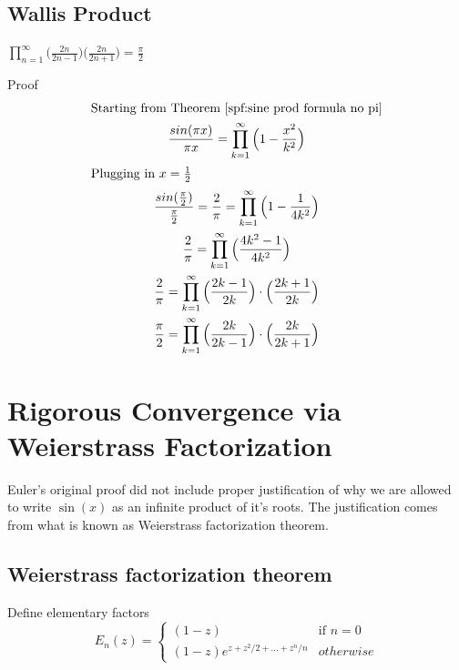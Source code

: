 \documentclass[a4paper]{article}
\begin{document}
\subsection{Wallis Product}
\label{spf:wallis product}
\begin{theorem} 
$\boxed{ 
\prod_{n=1}^{\infty} \Big( \frac{2n}{2n-1} \Big) \Big( \frac{2n}{2n+1} \Big) = \frac{\pi}{2}
}$

Proof\\
\begin{gather*}
\text{Starting from Theorem \ref{spf:sine prod formula no pi}}
\\
\frac{sin(\pi x)}{\pi x} = \prod_{k=1}^{\infty} \Big( 1-\frac{x^2}{k^2} \Big)
\\
\intertext{Plugging in $x=\frac{1}{2}$}
\frac{sin(\frac{\pi}{2})}{\frac{\pi}{2}} = 
\frac{2}{\pi} = \prod_{k=1}^{\infty} \Big( 1-\frac{1}{4 k^2} \Big)
\\
\frac{2}{\pi} = \prod_{k=1}^{\infty} \Big( \frac{4 k^2 -1}{4 k^2} \Big)
\\
\frac{2}{\pi} = \prod_{k=1}^{\infty} \Big( \frac{2 k -1}{2 k} \Big) \cdot \Big( \frac{2 k +1}{2 k} \Big)
\\
\frac{\pi}{2} = \prod_{k=1}^{\infty} \Big( \frac{2k}{2 k -1} \Big) \cdot \Big( \frac{2 k }{2 k+1} \Big)
\end{gather*}
\end{theorem}



\section{Rigorous Convergence via Weierstrass Factorization}\label{spf:sec:convergence}
\label{spf:rigour}
Euler's original proof did not include proper justification of why we are allowed to write $\sin(x)$ as an infinite product of it's roots. The justification comes from what is known as Weierstrass factorization theorem. 

\subsection{Weierstrass factorization theorem}
Define elementary factors
\begin{equation}
E_{n}(z) = 
\begin{cases}
(1-z) &\text{if } n=0 \\
(1-z) e^{z + z^2/2 + ... + z^n /n} & otherwise 
\end{cases}
\end{equation}
\end{document}
